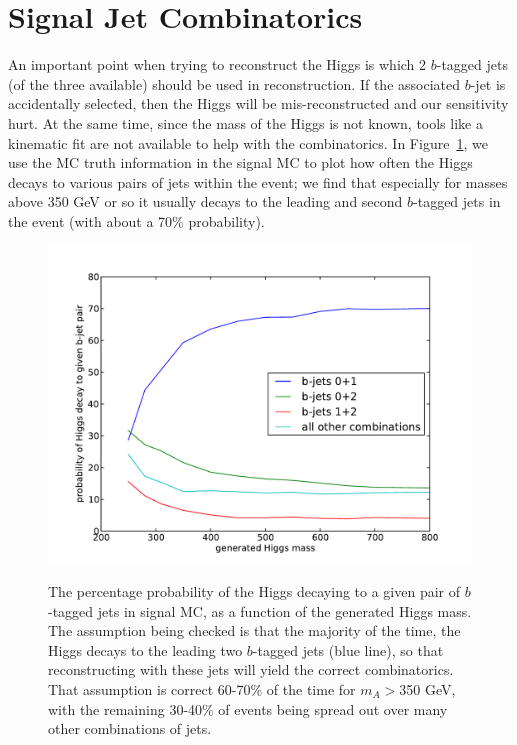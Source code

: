 \section{Signal Jet Combinatorics}
\label{sec:combinatorics}
An important point when trying to reconstruct the Higgs is which 2 $b$-tagged jets (of the
three available) should be used in reconstruction.  If the associated $b$-jet is accidentally
selected, then the Higgs will be mis-reconstructed and our sensitivity hurt.  At the same time,
since the mass of the Higgs is not known, tools like a kinematic fit are not available to
help with the combinatorics.  In Figure~\ref{fig:combinatorics}, we use the MC truth
information in the signal MC to plot how often the Higgs decays to various pairs of jets
within the event; we find that especially for masses above 350 GeV or so it usually decays to
the leading and second $b$-tagged jets in the event (with about a 70\% probability).
    
\begin{figure}[hbt]
  \includegraphics[width=0.78\linewidth]{SignalKin/combinatorics.pdf}
  \label{fig:combinatorics}
  \caption{The percentage probability of the Higgs decaying to a given pair of $b$-tagged jets in signal MC,
    as a function of the generated Higgs mass.  The assumption being checked is that the majority of
    the time, the Higgs decays to the leading two $b$-tagged jets (blue line), so that reconstructing with these jets
    will yield the correct combinatorics.  That assumption is correct 60-70\% of the time for $m_A>$350 GeV,
    with the remaining 30-40\% of events being spread out over many other combinations of jets.}
\end{figure}
                                                                                                                                    
